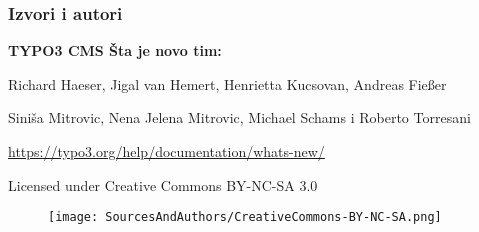 
\begin{frame}[fragile]
	\frametitle{Izvori i autori}

	\vspace{-0.6cm}

	\centerline{\textbf{TYPO3 CMS Šta je novo tim:}}

	\begin{center}
		\centerline{Richard Haeser, Jigal van Hemert, Henrietta Kucsovan, Andreas Fießer}
		\centerline{Siniša Mitrovic, Nena Jelena Mitrovic, Michael Schams i Roberto Torresani}
	\end{center}

	\vspace{0.8cm}

	\smaller\begin{center}\url{https://typo3.org/help/documentation/whats-new/}\end{center}\normalsize

	\vspace{1cm}

	\smaller\begin{center}Licensed under Creative Commons BY-NC-SA 3.0\end{center}\normalsize
	\begin{figure}\vspace*{-0.4cm}
		\texttt{[image: SourcesAndAuthors/CreativeCommons-BY-NC-SA.png]}
	\end{figure}

\end{frame}

